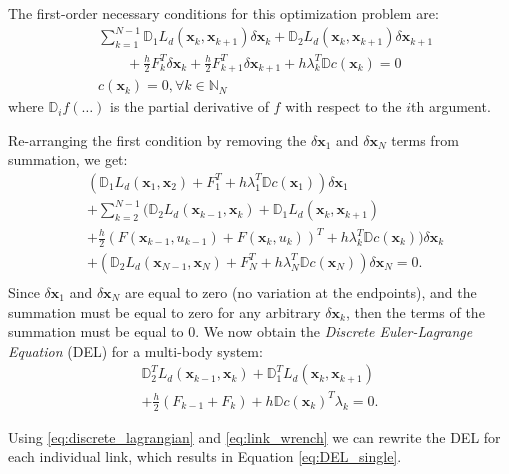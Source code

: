 \documentclass[conference]{IEEEtran}
\begin{document}
The first-order necessary conditions for this optimization problem are:
\begin{subequations}
\begin{align}
    &\sum_{k=1}^{N-1} \mathbb{D}_1 L_d(\mathbf{x}_k, \mathbf{x}_{k+1}) \delta \mathbf{x}_k 
     + \mathbb{D}_2 L_d(\mathbf{x}_k, \mathbf{x}_{k+1}) \delta \mathbf{x}_{k+1} \nonumber \\
    &\qquad+\frac{h}{2} F_k^T \delta \mathbf{x}_k
           +\frac{h}{2} F_{k+1}^T \delta \mathbf{x}_{k+1} 
           + h \lambda_k^T \mathbb{D} c(\mathbf{x}_k) = 0 \\
    &c(\mathbf{x}_k) = 0, \forall k \in \mathbb{N}_{N}
\end{align}
\end{subequations}
where $\mathbb{D}_i f(\dots)$ is the partial derivative of $f$ with respect to the $i$th 
argument.

Re-arranging the first condition by removing the $\delta \mathbf{x}_1$ and 
$\delta \mathbf{x}_N$ terms from summation, we get:
\begin{equation}
\begin{aligned}
    &\left(\mathbb{D}_1 L_d(\mathbf{x}_1, \mathbf{x}_2) 
      + F_1^T + h \lambda_1^T \mathbb{D} c(\mathbf{x}_1) 
     \right) \delta \mathbf{x}_1 \\
    & +\sum_{k=2}^{N-1} \Big( \mathbb{D}_2 L_d(\mathbf{x}_{k-1}, \mathbf{x}_k) 
       + \mathbb{D}_1 L_d(\mathbf{x}_{k}, \mathbf{x}_{k+1}) \\
    &   + \frac{h}{2} (F(\mathbf{x}_{k-1}, u_{k-1}) + F(\mathbf{x}_k, u_k))^T 
                     + h \lambda_k^T \mathbb{D} c(\mathbf{x}_k) 
    \Big) \delta \mathbf{x}_k \\
    &+ \left(\mathbb{D}_2 L_d(\mathbf{x}_{N-1}, \mathbf{x}_N) 
     + F_N^T + h \lambda_N^T \mathbb{D}c(\mathbf{x}_N)\right) \delta \mathbf{x}_N = 0. \\
\end{aligned}
\end{equation}
Since $\delta \mathbf{x}_1$ and $\delta \mathbf{x}_N$ are equal to zero 
(no variation at the endpoints), and the summation must be equal to zero for any 
arbitrary $\delta \mathbf{x}_k$, then the terms of the summation must be equal to 0. We now obtain
the \textit{Discrete Euler-Lagrange Equation} (DEL) for a multi-body system:
\begin{multline}
    \mathbb{D}_2^T L_d(\mathbf{x}_{k-1}, \mathbf{x}_k)
       + \mathbb{D}_1^T L_d(\mathbf{x}_{k}, \mathbf{x}_{k+1}) \\
       + \frac{h}{2} (F_{k-1} + F_k) + h \mathbb{D} c(\mathbf{x}_k)^T \lambda_k  = 0.
\end{multline}

Using \eqref{eq:discrete_lagrangian} and \eqref{eq:link_wrench} we can rewrite the DEL for
each individual link, which results in Equation \eqref{eq:DEL_single}.
\end{document}
